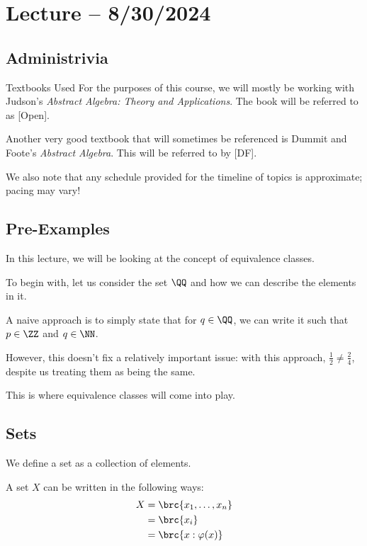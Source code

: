 \documentclass[openany]{book}
\begin{document}
\section{Lecture -- 8/30/2024}
\subsection{Administrivia}
\begin{miscbox}{Textbooks Used}
	For the purposes of this course, we will mostly be working with Judson's \textit{Abstract Algebra: Theory and Applications}. The book will be referred to as [Open].
	
	Another very good textbook that will sometimes be referenced is Dummit and Foote's \textit{Abstract Algebra}. This will be referred to by [DF].
\end{miscbox}

We also note that any schedule provided for the timeline of topics is approximate; pacing may vary!

\subsection{Pre-Examples}
In this lecture, we will be looking at the concept of equivalence classes.

\begin{example}
	To begin with, let us consider the set $\QQ$ and how we can describe the elements in it.
	
	A naive approach is to simply state that for $q \in \QQ$, we can write it such that $p \in \ZZ$ and $q \in \NN$.
	
	However, this doesn't fix a relatively important issue: with this approach, $\frac{1}{2} \neq \frac{2}{4}$, despite us treating them as being the same.
	
	This is where equivalence classes will come into play.
\end{example}

\subsection{Sets}
\begin{defn}[Set]
	We define a set as a collection of elements.
	
	A set $X$ can be written in the following ways:
	\begin{align*}
		X &= \brc{x_1, \ldots, x_n} \\
		&= \brc{x_i} \\
		&= \brc{x : \varphi(x)}
	\end{align*}
\end{defn}
\end{document}
